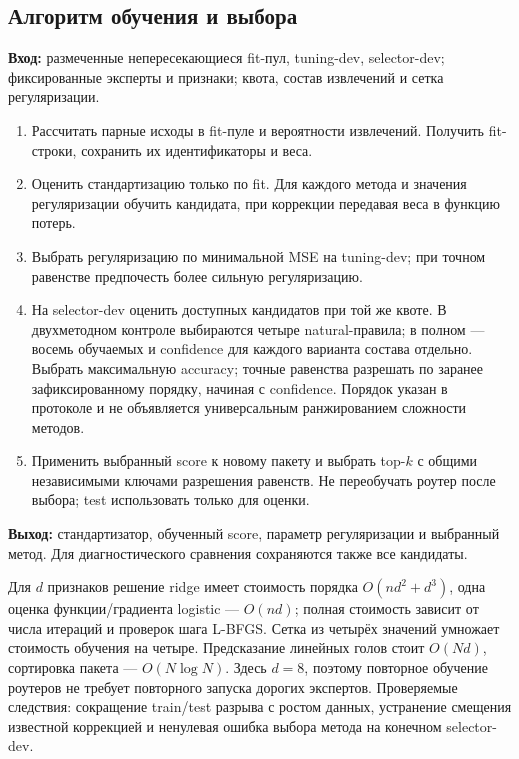 \subsection{Алгоритм обучения и выбора}
\noindent\textbf{Вход:} размеченные непересекающиеся fit-пул,
tuning-dev, selector-dev; фиксированные эксперты и признаки;
квота, состав извлечений и сетка регуляризации.
\begin{enumerate}
\item Рассчитать парные исходы в fit-пуле и вероятности извлечений.
Получить fit-строки, сохранить их идентификаторы и веса.
\item Оценить стандартизацию только по fit. Для каждого метода
и значения регуляризации обучить кандидата, при коррекции передавая
веса в функцию потерь.
\item Выбрать регуляризацию по минимальной MSE на tuning-dev;
при точном равенстве предпочесть более сильную регуляризацию.
\item На selector-dev оценить доступных кандидатов при той же квоте.
В двухметодном контроле выбираются четыре natural-правила;
в полном --- восемь обучаемых и confidence для каждого варианта
состава отдельно. Выбрать максимальную accuracy; точные равенства
разрешать по заранее зафиксированному порядку, начиная с confidence.
Порядок указан в протоколе и не объявляется универсальным
ранжированием сложности методов.
\item Применить выбранный score к новому пакету и выбрать top-$k$
с общими независимыми ключами разрешения равенств. Не переобучать
роутер после выбора; test использовать только для оценки.
\end{enumerate}
\noindent\textbf{Выход:} стандартизатор, обученный score, параметр
регуляризации и выбранный метод. Для диагностического сравнения
сохраняются также все кандидаты.

Для $d$ признаков решение ridge имеет стоимость порядка
$O(nd^2+d^3)$, одна оценка функции/градиента logistic --- $O(nd)$;
полная стоимость зависит от числа итераций и проверок шага L-BFGS.
Сетка из четырёх значений умножает стоимость обучения на четыре.
Предсказание линейных голов стоит $O(Nd)$, сортировка пакета ---
$O(N\log N)$. Здесь $d=8$, поэтому повторное обучение роутеров
не требует повторного запуска дорогих экспертов.
Проверяемые следствия: сокращение train/test разрыва с ростом данных,
устранение смещения известной коррекцией и ненулевая ошибка выбора
метода на конечном selector-dev.
